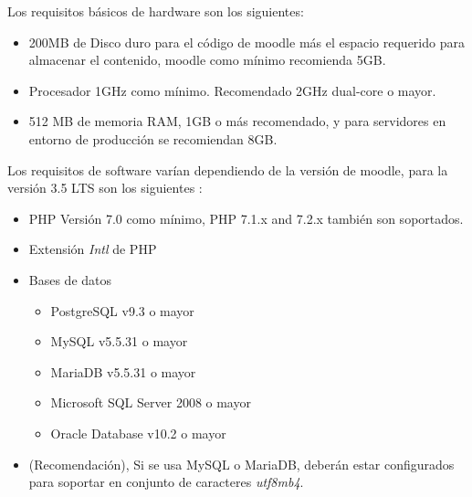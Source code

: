 \noindent Los requisitos básicos de hardware son los siguientes:

    \begin{itemize}
        \item 200MB de Disco duro para el código de moodle más el espacio requerido para almacenar el contenido, moodle como mínimo recomienda 5GB.
        \item Procesador 1GHz como mínimo. Recomendado 2GHz dual-core o mayor.
        \item 512 MB de memoria RAM, 1GB o más recomendado, y para servidores en entorno de producción se recomiendan 8GB.
    \end{itemize}
\clearpage    
\noindent Los requisitos de software varían dependiendo de la versión de moodle, para la versión 3.5 LTS son los siguientes \cite{moodleReleaseNotes}:
    
    \begin{itemize}
        \item PHP Versión 7.0 como mínimo, PHP 7.1.x and 7.2.x también son soportados.
        \item Extensión {\it Intl} de PHP
        \item Bases de datos
            \begin{itemize}
                \item PostgreSQL v9.3 o mayor
                \item MySQL v5.5.31 o mayor
                \item MariaDB v5.5.31 o mayor
                \item Microsoft SQL Server 2008 o mayor
                \item Oracle Database v10.2 o mayor
            \end{itemize}
        \item[] (Recomendación), Si se usa MySQL o MariaDB, deberán estar configurados para soportar en conjunto de caracteres {\it utf8mb4}.
    \end{itemize}
    
